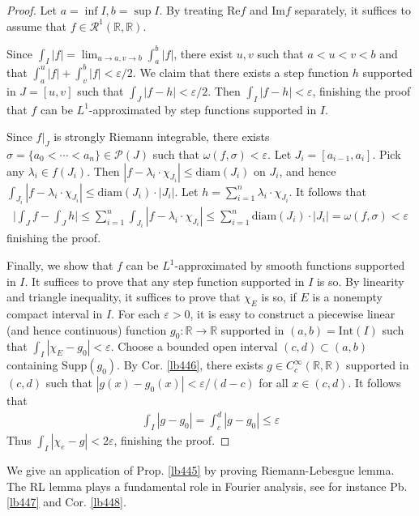 \documentclass[12pt,b5paper,notitlepage]{article}
\theoremstyle{definition}
\theoremstyle{plain}
\newcommand{\mc}{\mathcal}
\newcommand{\scr}{\mathscr}
\newcommand{\Rbb}{\mathbb R}
\newcommand{\Real}{\mathrm{Re}}
\newcommand{\Imag}{\mathrm{Im}}
\newcommand{\Supp}{\mathrm{Supp}}
\newcommand{\Int}{\mathrm{Int}}
\newcommand{\diam}{\mathrm{diam}}
\newcommand{\eps}{\varepsilon}
\numberwithin{equation}{section}
\begin{document}
\begin{proof}
Let $a=\inf I,b=\sup I$. By treating $\Real f$ and $\Imag f$ separately, it suffices to assume that $f\in\scr R^1(\Rbb,\Rbb)$. 

Since $\int_I|f|=\lim_{u\rightarrow a,v\rightarrow b} \int_a^b|f|$, there exist $u,v$ such that $a<u<v<b$ and that $\int_a^u|f|+\int_v^b|f|<\eps/2$. We claim that there exists a step function $h$ supported in $J=[u,v]$ such that $\int_J |f-h|<\eps/2$. Then $\int_I|f-h|<\eps$, finishing the proof that $f$ can be $L^1$-approximated by step functions supported in $I$.

Since $f|_J$ is strongly Riemann integrable, there exists $\sigma=\{a_0<\cdots<a_n\}\in\mc P(J)$ such that $\omega(f,\sigma)<\eps$. Let $J_i=[a_{i-1},a_i]$. Pick any $\lambda_i\in f(J_i)$. Then $|f-\lambda_i\cdot\chi_{J_i}|\leq\diam(J_i)$ on $J_i$, and hence $\int_{J_i}|f-\lambda_i\cdot\chi_{J_i}|\leq \diam(J_i)\cdot|J_i|$. Let $h=\sum_{i=1}^n\lambda_i\cdot\chi_{J_i}$. It follows that
\begin{align*}
\Big|\int_J f-\int_Jh  \Big|\leq\sum_{i=1}^n\int_{J_i}|f-\lambda_i\cdot\chi_{J_i}|\leq\sum_{i=1}^n\diam(J_i)\cdot|J_i|=\omega(f,\sigma)<\eps
\end{align*}
finishing the proof.

Finally, we show that $f$ can be $L^1$-approximated by smooth functions supported in $I$. It suffices to prove that any step function supported in $I$ is so. By linearity and triangle inequality, it suffices to prove that $\chi_E$ is so, if $E$ is a nonempty compact interval in $I$. For each $\eps>0$, it is easy to construct a piecewise linear (and hence continuous) function $g_0:\Rbb\rightarrow\Rbb$ supported in $(a,b)=\Int(I)$ such that $\int_I|\chi_E-g_0|<\eps$. Choose a bounded open interval $(c,d)\subset (a,b)$ containing $\Supp(g_0)$. By Cor. \ref{lb446}, there exists $g\in C_c^\infty(\Rbb,\Rbb)$ supported in $(c,d)$ such that $|g(x)-g_0(x)|<\eps/(d-c)$ for all $x\in(c,d)$. It follows that
\begin{align*}
\int_I|g-g_0|=\int_c^d |g-g_0|\leq\eps
\end{align*}
Thus $\int_I|\chi_e-g|<2\eps$, finishing the proof.
\end{proof}




We give an application of Prop. \ref{lb445} by proving Riemann-Lebesgue lemma. The RL lemma plays a fundamental role in Fourier analysis, see for instance Pb. \ref{lb447} and Cor. \ref{lb448}. 
\end{document}
